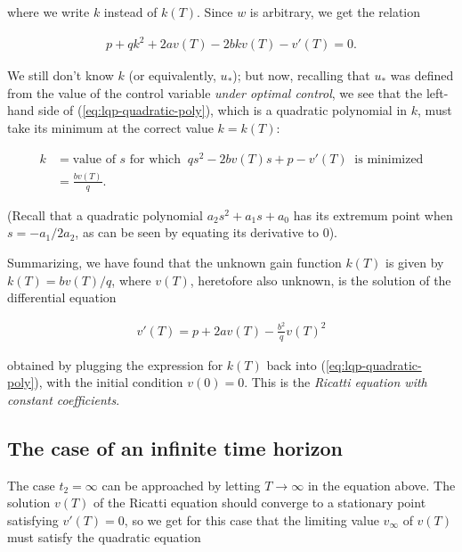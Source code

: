 \documentclass[11pt]{report}
\theoremstyle{plain}
\theoremstyle{definition}
\begin{document}
where we write $k$ instead of $k(T)$. Since $w$ is
arbitrary, we get the relation

\begin{equation*} \tag{50}\label{eq:lqp-quadratic-poly}
\begin{split}
p + q k^2 + 2av(T) -2 b k v(T) -v'(T) = 0.
\end{split}
\end{equation*}

We still don't know $k$ (or equivalently, $u_*$); but
now, recalling that $u_*$ was defined from the value
of the control variable \emph{under optimal control}, we
see that the left-hand side of
(\ref{eq:lqp-quadratic-poly}), which is a quadratic
polynomial in $k$, must take its minimum at the
correct value $k=k(T)$:

\begin{align*}
k &= \textrm{value of $s$ for which }\  qs^2-2b v(T) s + p-v'(T)\ \textrm{ is minimized} \\
&= \frac{b v(T)}{q}.
\end{align*}

(Recall that a quadratic polynomial $a_2s^2+a_1s+a_0$
has its extremum point when $s=-a_1/2a_2$, as can be
seen by equating its derivative to $0$).

Summarizing, we have found that the unknown gain
function $k(T)$ is given by $k(T) = b v(T)/q$, where
$v(T)$, heretofore also unknown, is the solution of
the differential equation

\begin{equation*} \tag{51}\label{eq:lqp-ricatti1}
\begin{split}
v'(T) = p + 2 a v(T) - \frac{b^2}{q} v(T)^2
\end{split}
\end{equation*}

obtained by plugging the expression for $k(T)$ back
into (\ref{eq:lqp-quadratic-poly}), with the initial
condition $v(0)=0$. This is the \emph{Ricatti equation
with constant coefficients}.

\subsection{The case of an infinite time horizon}
The case $t_2=\infty$ can be approached by letting
$T\to\infty$ in the equation above. The solution
$v(T)$ of the Ricatti equation should converge to a
stationary point satisfying $v'(T)=0$, so we get for
this case that the limiting value $v_\infty$ of $v(T)$
must satisfy the quadratic equation
\end{document}

